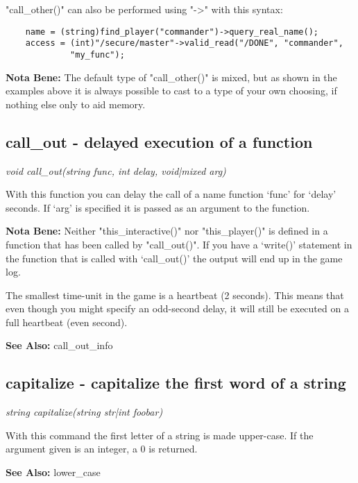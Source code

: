     "call\_other()" can also be performed using "->" with this syntax:

    \begin{verbatim}
    name = (string)find_player("commander")->query_real_name();
    access = (int)"/secure/master"->valid_read("/DONE", "commander", 
             "my_func");
    \end{verbatim}
    
    {\bf Nota Bene: }   The default type of "call\_other()" is mixed, but as shown in the
    examples above it is always possible to cast to a type of your
    own choosing, if nothing else only to aid memory.



\subsection{call\_out - delayed execution of a function}
    
    {\em void call\_out(string func, int delay, void|mixed arg)}

    With this function you can delay the call of a name function
    `func' for `delay' seconds. If `arg' is specified it is passed
    as an argument to the function.

    {\bf Nota Bene: }   Neither "this\_interactive()" nor "this\_player()" is defined
    in a function that has been called by "call\_out()". If you
    have a `write()' statement in the function that is called 
    with `call\_out()' the output will end up in the game log.

    The smallest time-unit in the game is a heartbeat (2 seconds). 
    This means that even though you might specify an odd-second delay, 
    it will still be executed on a full heartbeat (even second).

{\bf See Also: }
    call\_out\_info


\subsection{capitalize - capitalize the first word of a string}
    
    {\em string capitalize(string str|int foobar)}

    With this command the first letter of a string is made
    upper-case. If the argument given is an integer, a 0 is
    returned.

    {\bf See Also: }    lower\_case



